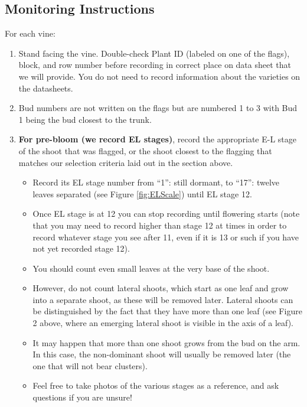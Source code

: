 \documentclass[11pt,letter]{article}
\newenvironment{smitemize}{
\begin{itemize}
  \setlength{\itemsep}{0pt}
  \setlength{\parskip}{0.8pt}
  \setlength{\parsep}{0pt}}
{\end{itemize}
}
\begin{document}
\subsection{Monitoring Instructions}
For each vine:
\begin{enumerate}
\item Stand facing the vine. Double-check Plant ID (labeled on one of the flags), block, and row number before recording in correct place on data sheet that we will provide. You do not need to record information about the varieties on the datasheets.
\item Bud numbers are not written on the flags but are numbered 1 to 3 with Bud 1 being the bud closest to the trunk.
\item {\bf For pre-bloom (we record EL stages)}, record the appropriate E-L stage of the shoot that was flagged, or the shoot closest to the flagging that matches our selection criteria laid out in the section above. 
	\begin{smitemize}
	\item Record its EL stage number from ``1'': still dormant, to ``17'': twelve leaves separated (see Figure \ref{fig:ELScale}) until EL stage 12. 
	\item Once EL stage is at 12 you can stop recording until flowering starts (note that you may need to record higher than stage 12 at times in order to record whatever stage you see after 11, even if it is 13 or such if you have not yet recorded stage 12).
	\item You should count even small leaves at the very base of the shoot. 
	\item However, do not count lateral shoots, which start as one leaf and grow into a separate shoot, as these will be removed later. Lateral shoots can be distinguished by the fact that they have more than one leaf (see Figure 2 above, where an emerging lateral shoot is visible in the axis of a leaf). 
	\item It may happen that more than one shoot grows from the bud on the arm. In this case, the non-dominant shoot will usually be removed later (the one that will not bear clusters).  
	\item Feel free to take photos of the various stages as a reference, and ask questions if you are unsure! 
	\end{smitemize}
	

\end{enumerate}
\end{document}
